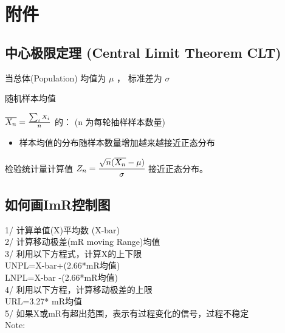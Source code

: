 \hypertarget{ux9644ux4ef6}{%
\section{附件}\label{ux9644ux4ef6}}

\hypertarget{ux4e2dux5fc3ux6781ux9650ux5b9aux7406-central-limit-theorem-clt}{%
\subsection{中心极限定理 (Central Limit Theorem
CLT)}\label{ux4e2dux5fc3ux6781ux9650ux5b9aux7406-central-limit-theorem-clt}}

当总体(Population) 均值为 \(\mu\) ， 标准差为 \(\sigma\)

\begin{description}
\tightlist
\item[]
随机样本均值
\end{description}

\(\overline{X_n} = {\sum_i X_i \over n}\) 的： (n 为每轮抽样样本数量)

\begin{description}
\item[]
\end{description}

\begin{itemize}
\tightlist
\item
  样本均值的分布随样本数量增加越来越接近正态分布
\end{itemize}

检验统计量计算值
\(Z_n = \cfrac{ \sqrt{n}(\overline{X_n} - \mu) }{\sigma}\)
接近正态分布。\\

\hypertarget{ux5982ux4f55ux753bimrux63a7ux5236ux56fe}{%
\subsection{如何画ImR控制图}\label{ux5982ux4f55ux753bimrux63a7ux5236ux56fe}}

1/ 计算单值(X)平均数 (X-bar)\\
2/ 计算移动极差(mR moving Range)均值\\
3/ 利用以下方程式，计算X的上下限\\
UNPL=X-bar+(2.66*mR均值)\\
LNPL=X-bar -(2.66*mR均值)\\
4/ 利用以下方程，计算移动极差的上限\\
URL=3.27* mR均值\\
5/ 如果X或mR有超出范围，表示有过程变化的信号，过程不稳定\\
Note:

